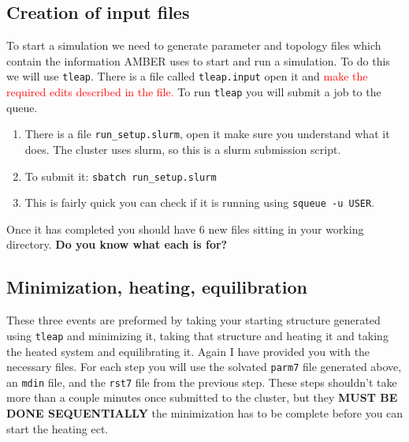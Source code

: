 \documentclass[11pt]{article}
\begin{document}
\subsection{Creation of input files}
To start a simulation we need to generate parameter and topology files which contain the information AMBER uses to start and run a simulation. To do this we will use \texttt{tleap}. There is a file called \texttt{tleap.input} open it and \textcolor{red}{make the required edits described in the file.}
\newline
\newline
To run \texttt{tleap} you will submit a job to the queue. 
\begin{enumerate}
    \item There is a file \texttt{run\_setup.slurm}, open it make sure you understand what it does. The cluster uses slurm, so this is a slurm submission script. 
    \item To submit it: \texttt{sbatch run\_setup.slurm}
    \item This is fairly quick you can check if it is running using \texttt{squeue -u USER}. 
\end{enumerate}

Once it has completed you should have 6 new files sitting in your working directory. \textbf{Do you know what each is for?}


\subsection{Minimization, heating, equilibration}

These three events are preformed by taking your starting structure generated using \texttt{tleap} and minimizing it, taking that structure and heating it and taking the heated system and equilibrating it. Again I have provided you with the necessary files. For each step you will use the solvated \texttt{parm7} file generated above, an \texttt{mdin} file, and the \texttt{rst7} file from the previous step. These steps shouldn't take more than a couple minutes once submitted to the cluster, but they \textbf{MUST BE DONE SEQUENTIALLY} the minimization has to be complete before you can start the heating ect.
\end{document}
